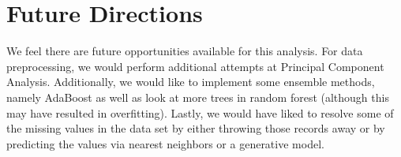 \documentclass[twoside,11pt]{article}
\begin{document}
\section{Future Directions}
We feel there are future opportunities available for this analysis. For data preprocessing, we would perform additional attempts at Principal Component Analysis.  Additionally, we would like to implement some ensemble methods, namely AdaBoost as well as look at more trees in random forest (although this may have resulted in overfitting).  Lastly, we would have liked to resolve some of the missing values in the data set by either throwing those records away or by predicting the values via nearest neighbors or a generative model.

\end{document}
